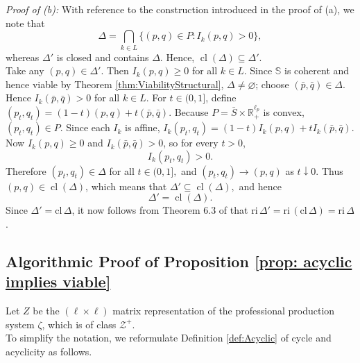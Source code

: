 \documentclass[11pt,fleqn]{article}
\begin{document}
	\medskip\noindent
	\emph{Proof of (b):} With reference to the construction introduced in the proof of (a), we note that 
	\[
	\Delta=\bigcap_{k\in L}\{(p,q)\in P: I_k(p,q)>0\},
	\]
whereas \(\Delta'\) is closed and contains \(\Delta\). Hence, $\operatorname{cl}(\Delta)\subseteq \Delta'.$\\
	Take any \((p,q)\in \Delta'\). Then $	I_k(p,q)\geqslant 0$ for all $ k\in L$.	
	Since $\mathbb S$ is coherent and hence viable by Theorem \ref{thm:ViabilityStructural}, $\Delta \neq \varnothing$; choose $	(\bar p,\bar q)\in \Delta$.	Hence
	 $	I_k(\bar p,\bar q)>0$ for all $ k\in L$.	
	For \(t\in(0,1]\), define $	(p_t,q_t)
	=(1-t)(p,q)+t(\bar p,\bar q)$. Because \(P= \bar S \times \mathbb R^{\ell_p}_+\) is convex, $(p_t,q_t)\in P$.	Since each \(I_k\) is affine,
$
	I_k(p_t,q_t)
	=(1-t)I_k(p,q)+tI_k(\bar p,\bar q).
$
	Now \(I_k(p,q)\geqslant 0\) and \(I_k(\bar p,\bar q)>0\), so for every
	\(t>0\),
	\[
	I_k(p_t,q_t)>0.
	\]
	Therefore $
	(p_t,q_t)\in \Delta$ for all $t\in(0,1],
$ and 
	$	(p_t,q_t)\to(p,q)$ as $ t\downarrow0$.
	Thus \((p,q)\in\operatorname{cl}(\Delta)\), which means that
	$
	\Delta'\subseteq \operatorname{cl}(\Delta),
$ and hence
	\[
	\Delta'=\operatorname{cl}(\Delta).
	\]
	Since $\Delta' = \mathrm{cl} \, \Delta$, it now follows from Theorem 6.3 of \citet{Rockafellar1970} that $\mathrm{ri} \, \Delta' = \mathrm{ri} \, \left( \mathrm{cl} \, \Delta \right) = \mathrm{ri} \, \Delta$.

\subsection{Algorithmic Proof of Proposition \ref{prop: acyclic implies viable}}\label{sec: app Acyc}

Let $Z$ be the $( \ell \times \ell)$ matrix representation of the professional production system $\zeta$, which  is of class $\mathcal Z^+$.  \\
To simplify the notation, we reformulate Definition \ref{def:Acyclic} of cycle and acyclicity  as follows. 
\end{document}
